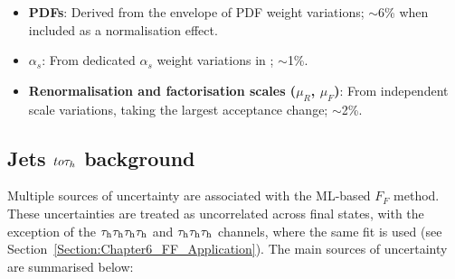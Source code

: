 \begin{itemize}
\item \textbf{PDFs}: Derived from the envelope of PDF weight variations; $\sim$6\% when included as a normalisation effect.
\item \boldmath$\alpha_s$\unboldmath: From dedicated $\alpha_s$ weight variations in \MCATNLO; $\sim$1\%.
\item \textbf{Renormalisation and factorisation scales ($\mu_R$, $\mu_F$)}: From independent scale variations, taking the largest acceptance change; $\sim$2\%.
\end{itemize}

\subsection{Jets \texorpdfstring{$to \tau_h$}{to hadronic tau} background}

Multiple sources of uncertainty are associated with the ML-based $F_F$ method. These uncertainties are treated as uncorrelated across final states, with the exception of the $\tau_\mathrm{h}\tau_\mathrm{h}\tau_\mathrm{h}\tau_\mathrm{h}$ and $\tau_\mathrm{h}\tau_\mathrm{h}\tau_\mathrm{h}$ channels, where the same fit is used (see Section~\ref{Section:Chapter6_FF_Application}). The main sources of uncertainty are summarised below:

